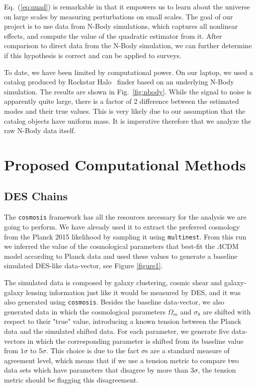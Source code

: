\documentclass[12pt]{article}
\newcommand{\rf}[1]{\ref{fig:#1}}
\newcommand{\ec}[1]{Eq.~(\ref{eq:#1})}
\begin{document}
\begin{small}
\ec{quad} is remarkable in that it empowers us to learn about the universe on large scales by measuring perturbations on small scales. 
The goal of our project is to use data from N-Body simulations, which captures all nonlinear effects, and compute the value of the quadratic estimator from it. After comparison to direct data from the N-Body simulation, we can further determine if this hypothesis is correct and can be applied to surveys.


To date, we have been limited by computational power. On our laptop, we used a catalog produced by Rockstar Halo~\cite{2013ApJ...762..109B} finder based on an underlying N-Body simulation. The results are shown in Fig.~\rf{nbody}. While the signal to noise is apparently quite large, there is a factor of 2 difference between the estimated modes and their true values. This is very likely due to our assumption that the catalog objects have uniform mass. It is imperative therefore that we analyze the raw N-Body data itself.


\section{Proposed Computational Methods}
\subsection{DES Chains}

The {\tt cosmosis} framework has all the resources necessary for the analysis we are going to perform. We have already used it to extract the preferred cosmology from the Planck 2015 likelihood  by sampling it using {\tt multinest}. From this run we inferred the value of the cosmological parameters that best-fit the $\Lambda$CDM model according to Planck data and used these values to generate a baseline simulated DES-like data-vector, see Figure \ref{figure1}.


The simulated data is composed by galaxy clustering, cosmic shear and galaxy-galaxy lensing information just like it would be measured by DES, and it was also generated using {\tt cosmosis}. Besides the baseline data-vector, we also generated data in which the cosmological parameters $\Omega_m$ and $\sigma_8$ are shifted with respect to their "true" value, introducing a known tension between the Planck data and the simulated shifted data. For each parameter, we generate five data-vectors in which the corresponding parameter is shifted from its baseline value from $1\sigma$ to $5\sigma$. This choice is due to the fact $\sigma$s are a standard measure of agreement level, which means that if we use a tension metric to compare two data sets which have parameters that disagree by more than $3\sigma$, the tension metric should be flagging this disagreement. 


\end{small}
\end{document}
